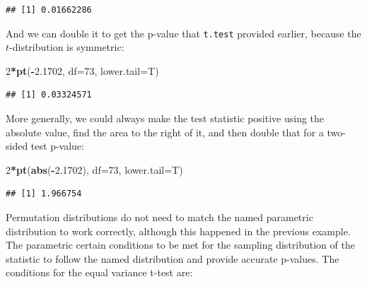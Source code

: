 \documentclass[]{book}
\newenvironment{Shaded}{\begin{snugshade}}{\end{snugshade}}
\newcommand{\KeywordTok}[1]{\textcolor[rgb]{0.13,0.29,0.53}{\textbf{#1}}}
\newcommand{\DataTypeTok}[1]{\textcolor[rgb]{0.13,0.29,0.53}{#1}}
\newcommand{\DecValTok}[1]{\textcolor[rgb]{0.00,0.00,0.81}{#1}}
\newcommand{\FloatTok}[1]{\textcolor[rgb]{0.00,0.00,0.81}{#1}}
\newcommand{\OperatorTok}[1]{\textcolor[rgb]{0.81,0.36,0.00}{\textbf{#1}}}
\newcommand{\NormalTok}[1]{#1}
\begin{document}
\begin{verbatim}
## [1] 0.01662286
\end{verbatim}

And we can double it to get the p-value that \texttt{t.test} provided
earlier, because the \(t\)-distribution is symmetric:

\begin{Shaded}
\begin{Highlighting}[]
\DecValTok{2}\OperatorTok{*}\KeywordTok{pt}\NormalTok{(}\OperatorTok{-}\FloatTok{2.1702}\NormalTok{, }\DataTypeTok{df=}\DecValTok{73}\NormalTok{, }\DataTypeTok{lower.tail=}\NormalTok{T)}
\end{Highlighting}
\end{Shaded}

\begin{verbatim}
## [1] 0.03324571
\end{verbatim}

More generally, we could always make the test statistic positive using
the absolute value, find the area to the right of it, and then double
that for a two-sided test p-value:

\begin{Shaded}
\begin{Highlighting}[]
\DecValTok{2}\OperatorTok{*}\KeywordTok{pt}\NormalTok{(}\KeywordTok{abs}\NormalTok{(}\OperatorTok{-}\FloatTok{2.1702}\NormalTok{), }\DataTypeTok{df=}\DecValTok{73}\NormalTok{, }\DataTypeTok{lower.tail=}\NormalTok{T)}
\end{Highlighting}
\end{Shaded}

\begin{verbatim}
## [1] 1.966754
\end{verbatim}

Permutation distributions do not need to match the named parametric
distribution to work correctly, although this happened in the previous
example. The parametric certain conditions to be met for the sampling
distribution of the statistic to follow the named distribution and
provide accurate p-values. The conditions for the equal variance t-test
are:
\end{document}

